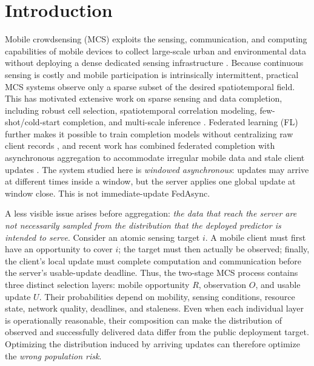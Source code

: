 \documentclass[letterpaper,journal]{IEEEtran}
\begin{document}
\section{Introduction}
\label{sec:introduction}

Mobile crowdsensing (MCS) exploits the sensing, communication, and computing
capabilities of mobile devices to collect large-scale urban and environmental
data without deploying a dense dedicated sensing infrastructure
\cite{ganti2011mobile,guo2015mobile,ma2014opportunities}.  Because
continuous sensing is costly and mobile participation is intrinsically
intermittent, practical MCS systems observe only a sparse subset of the desired
spatiotemporal field.  This has motivated extensive work on sparse sensing and
data completion, including robust cell selection, spatiotemporal correlation
modeling, few-shot/cold-start completion, and multi-scale inference
\cite{wang2023outlier,li2024robust,wang2023transformer,wang2024fewshot,wang2025evolutionary,xu2025rethinking,liu2026pyramid,zhang2026mapt}.
Federated learning (FL) further makes it possible to train completion models
without centralizing raw client records
\cite{mcmahan2017communication,yang2019federated,kairouz2021advances,li2020federated},
and recent work has combined federated completion with asynchronous aggregation
to accommodate irregular mobile data and stale client updates
\cite{wang2026federated,xie2019asynchronous,liu2023adaptive,sun2024staleness}.
The system studied here is \emph{windowed asynchronous}: updates may arrive at
different times inside a window, but the server applies one global update at
window close.  This is not immediate-update FedAsync.

A less visible issue arises before aggregation: \emph{the data that reach the
server are not necessarily sampled from the distribution that the deployed
predictor is intended to serve}.  Consider an atomic sensing target $i$.  A
mobile client must first have an opportunity to cover $i$; the target must then
actually be observed; finally, the client's local update must complete
computation and communication before the server's usable-update deadline.
Thus, the two-stage MCS process contains three distinct selection layers:
mobile opportunity $R$, observation $O$, and usable update $U$.  Their
probabilities depend on mobility, sensing conditions, resource state, network
quality, deadlines, and staleness.  Even when each individual layer is
operationally reasonable, their composition can make the distribution of
observed and successfully delivered data differ from the public deployment
target.  Optimizing the distribution induced by arriving updates can therefore
optimize the \emph{wrong population risk}.
\end{document}
